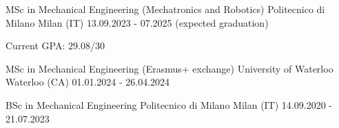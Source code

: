 
\begin{cventries}

  \cventry
  {MSc in Mechanical Engineering (Mechatronics and Robotics)}
  {Politecnico di Milano}
  {Milan (IT)}
  {13.09.2023 - 07.2025 (expected graduation)}
  {
    \begin{cvitems}
      \item {Current GPA: 29.08/30}
    \end{cvitems}
  }

  \cventry
  {MSc in Mechanical Engineering (Erasmus+ exchange)}
  {University of Waterloo}
  {Waterloo (CA)}
  {01.01.2024 - 26.04.2024}
  {}
  \vspace{-4mm}

  \cventry
  {BSc in Mechanical Engineering}
  {Politecnico di Milano}
  {Milan (IT)}
  {14.09.2020 - 21.07.2023}
  {}

\end{cventries}
